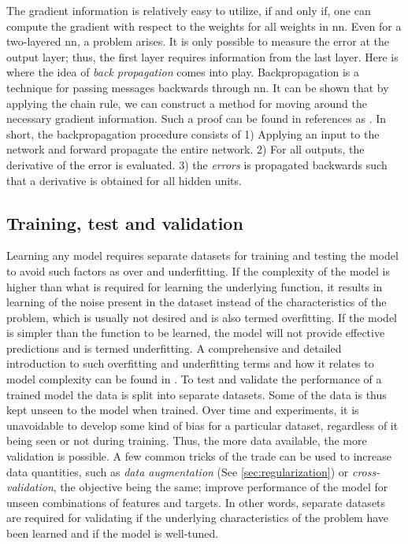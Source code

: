 The gradient information is relatively easy to utilize, if and only if, one can compute the gradient with respect to the weights for all weights in \gls{nn}. Even for a two-layered \gls{nn}, a problem arises. It is only possible to measure the error at the output layer; thus, the first layer requires information from the last layer. Here is where the idea of \emph{back propagation} comes into play. Backpropagation is a technique for passing messages backwards through \gls{nn}. It can be shown that by applying the chain rule, we can construct a method for moving around the necessary gradient information. Such a proof can be found in references as \cite{Nielsen2015, M.Bishop2006}. In short, the backpropagation procedure consists of 1) Applying an input to the network and forward propagate the entire network. 2) For all outputs, the derivative of the error is evaluated. 3) the \emph{errors} is propagated backwards such that a derivative is obtained for all hidden units. 
 



\subsection{Training, test and validation}
Learning any model requires separate datasets for training and testing the model to avoid such factors as over and underfitting. If the complexity of the model is higher than what is required for learning the underlying function, it results in learning of the noise present in the dataset instead of the characteristics of the problem, which is usually not desired and is also termed overfitting. If the model is simpler than the function to be learned, the model will not provide effective predictions and is termed underfitting. A comprehensive and detailed introduction to such overfitting and underfitting terms and how it relates to model complexity can be found in \cite{M.Bishop2006}. To test and validate the performance of a trained model the data is split into separate datasets. Some of the data is thus kept unseen to the model when trained. Over time and experiments, it is unavoidable to develop some kind of bias for a particular dataset, regardless of it being seen or not during training. Thus, the more data available, the more validation is possible. A few common tricks of the trade can be used to increase data quantities, such as \emph{data augmentation} (See \ref{sec:regularization}) or \emph{cross-validation}, the objective being the same; improve performance of the model for unseen combinations of features and targets. In other words, separate datasets are required for validating if the underlying characteristics of the problem have been learned and if the model is well-tuned.

